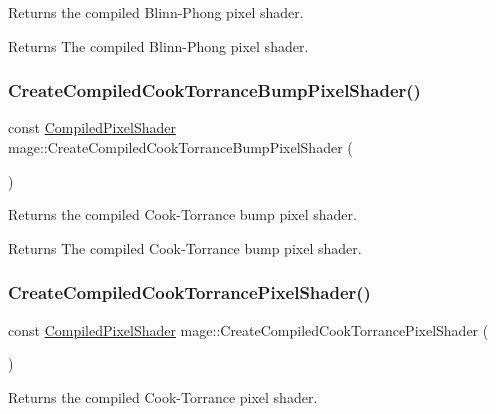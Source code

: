 Returns the compiled Blinn-\/\+Phong pixel shader.

\begin{DoxyReturn}{Returns}
The compiled Blinn-\/\+Phong pixel shader. 
\end{DoxyReturn}
\hypertarget{namespacemage_af0332739c80c39ec1bf4172f51827e02}{}\label{namespacemage_af0332739c80c39ec1bf4172f51827e02} 
\subsubsection{\texorpdfstring{Create\+Compiled\+Cook\+Torrance\+Bump\+Pixel\+Shader()}{CreateCompiledCookTorranceBumpPixelShader()}}
{\footnotesize\ttfamily const \hyperlink{structmage_1_1_compiled_pixel_shader}{Compiled\+Pixel\+Shader} mage\+::\+Create\+Compiled\+Cook\+Torrance\+Bump\+Pixel\+Shader (\begin{DoxyParamCaption}{ }\end{DoxyParamCaption})}

Returns the compiled Cook-\/\+Torrance bump pixel shader.

\begin{DoxyReturn}{Returns}
The compiled Cook-\/\+Torrance bump pixel shader. 
\end{DoxyReturn}
\hypertarget{namespacemage_ac405d487863938157710d7c7e46c40cf}{}\label{namespacemage_ac405d487863938157710d7c7e46c40cf} 
\subsubsection{\texorpdfstring{Create\+Compiled\+Cook\+Torrance\+Pixel\+Shader()}{CreateCompiledCookTorrancePixelShader()}}
{\footnotesize\ttfamily const \hyperlink{structmage_1_1_compiled_pixel_shader}{Compiled\+Pixel\+Shader} mage\+::\+Create\+Compiled\+Cook\+Torrance\+Pixel\+Shader (\begin{DoxyParamCaption}{ }\end{DoxyParamCaption})}

Returns the compiled Cook-\/\+Torrance pixel shader.

